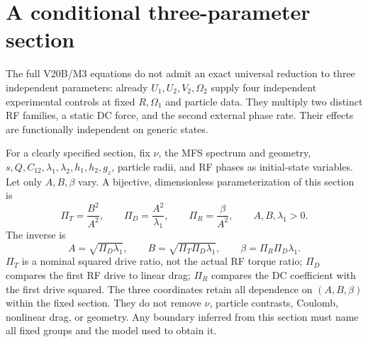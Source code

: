\section{A conditional three-parameter section}
The full V20B/M3 equations do not admit an exact universal reduction to
three independent parameters: already $U_1,U_2,V_2,\Omega_2$ supply four
independent experimental controls at fixed $R,\Omega_1$ and particle data.
They multiply two distinct RF families, a static DC force, and the second
external phase rate. Their effects are functionally independent on generic
states.

For a clearly specified section, fix $\nu$, the MFS spectrum and geometry,
$s,Q,C_{12},\lambda_1,\lambda_2,h_1,h_2,g_z$, particle radii, and RF phases
as initial-state variables. Let only $A,B,\beta$ vary. A bijective,
dimensionless parameterization of this section is
\begin{equation}
\Pi_T=\frac{B^2}{A^2},\qquad
\Pi_D=\frac{A^2}{\lambda_1},\qquad
\Pi_R=\frac{\beta}{A^2},\qquad A,B,\lambda_1>0.
\end{equation}
The inverse is
\begin{equation}
A=\sqrt{\Pi_D\lambda_1},\qquad
B=\sqrt{\Pi_T\Pi_D\lambda_1},\qquad
\beta=\Pi_R\Pi_D\lambda_1.
\end{equation}
$\Pi_T$ is a nominal squared drive ratio, not the actual RF torque ratio;
$\Pi_D$ compares the first RF drive to linear drag; $\Pi_R$ compares the
DC coefficient with the first drive squared. The three coordinates retain
all dependence on $(A,B,\beta)$ within the fixed section. They do not
remove $\nu$, particle contrasts, Coulomb, nonlinear drag, or geometry.
Any boundary inferred from this section must name all fixed groups and the
model used to obtain it.
